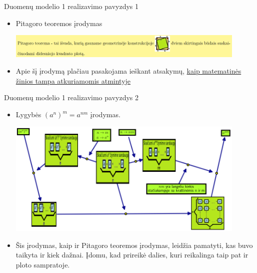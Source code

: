 \documentclass[xcolor={dvipsnames}]{beamer}
\begin{document}
\begin{frame}[fragile]{Duomenų modelio 1 realizavimo pavyzdys 1}
\begin{itemize}
\item<1-> Pitagoro teoremos įrodymas

\includegraphics[width=0.9\textwidth]{pyth4.png}

\item<2-> Apie šį įrodymą plačiau pasakojama ieškant atsakymų, \href{https://github.com/loijord/General/blob/master/READING/proofs\_and\_memory/kaip\_atkurti\_matematika\_atmintyje.pdf}{kaip matematinės žinios tampa atkuriamomis atmintyje}
\end{itemize}
\end{frame}

\begin{frame}[fragile]{Duomenų modelio 1 realizavimo pavyzdys 2}
\begin{itemize}
\item<1-> Lygybės $(a^n)^m = a^{nm}$ įrodymas.

\includegraphics[width=0.9\textwidth]{neuro_output.png}

\item<2-> Šis įrodymas, kaip ir Pitagoro teoremos įrodymas, leidžia pamatyti, kas buvo taikyta ir kiek dažnai. Įdomu, kad prireikė dalies, kuri reikalinga taip pat ir ploto sampratoje.
\end{itemize}
\end{frame}
\end{document}
